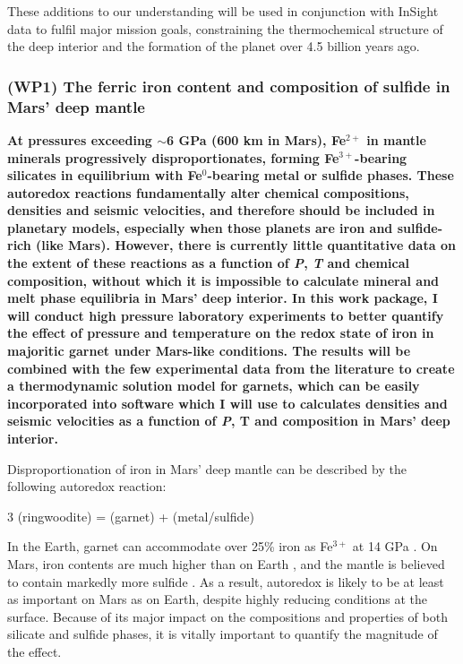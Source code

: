 \documentclass[11pt,twoside,a4paper]{article}
\begin{document}
These additions to our understanding will be used in conjunction with InSight data to fulfil major mission goals, constraining the thermochemical structure of the deep interior and the formation of the planet over 4.5 billion years ago.

\subsubsection*{(WP1) The ferric iron content and composition of sulfide in Mars' deep mantle}
\textbf{At pressures exceeding $\sim$6 GPa (600 km in Mars), Fe$^{2+}$ in mantle minerals progressively disproportionates, forming Fe$^{3+}$-bearing silicates \citep[e.g.][]{Frostetal2004, Rohrbachetal2007} in equilibrium with Fe$^0$-bearing metal or sulfide phases. These autoredox reactions fundamentally alter chemical compositions, densities and seismic velocities, and therefore should be included in planetary models, especially when those planets are iron and sulfide-rich (like Mars). However, there is currently little quantitative data on the extent of these reactions as a function of \emph{P}, \emph{T} and chemical composition, without which it is impossible to calculate mineral and melt phase equilibria in Mars' deep interior.  In this work package, I will conduct high pressure laboratory experiments to better quantify the effect of pressure and temperature on the redox state of iron in majoritic garnet under Mars-like conditions. The results will be combined with the few experimental data from the literature to create a thermodynamic solution model for garnets, which can be easily incorporated into software which I will use to calculates densities and seismic velocities as a function of \emph{P}, T and composition in Mars' deep interior.}

Disproportionation of iron in Mars' deep mantle can be described by the following autoredox reaction:
\begin{reaction}
  3  (ringwoodite) =  (garnet) +  (metal/sulfide)
\end{reaction}
In the Earth, garnet can accommodate over 25\% iron as Fe$^{3+}$ at 14 GPa \citep{Rohrbachetal2007,Rohrbachetal2011}. On Mars, iron contents are much higher than on Earth \citep[Mg\# $\sim$ 75 vs. 90;][]{WD1994}, and the mantle is believed to contain markedly more sulfide \citep[$\sim$6000 vs $<$1000 wt ppm FeS;][]{MS1995,TWW2013}. As a result, autoredox is likely to be at least as important on Mars as on Earth, despite highly reducing conditions at the surface. Because of its major impact on the compositions and properties of both silicate and sulfide phases, it is vitally important to quantify the magnitude of the effect. 
\end{document}
